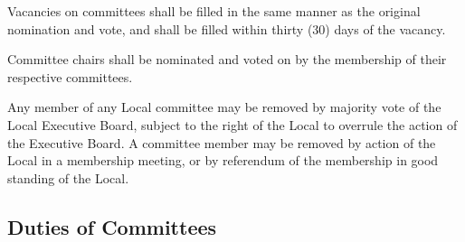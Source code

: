 \documentclass[11pt]{article}
\begin{document}
Vacancies on committees shall be filled in the same manner as the original nomination and vote, and shall be filled within thirty (30) days of the vacancy.

Committee chairs shall be nominated and voted on by the membership of their respective committees.

Any member of any Local committee may be removed by majority vote of the Local Executive Board, subject to the right of the Local to overrule the action of the Executive Board. A committee member may be removed by action of the Local in a membership meeting, or by referendum of the membership in good standing of the Local.

\subsection{Duties of Committees}\label{duties-of-committees}
\end{document}
